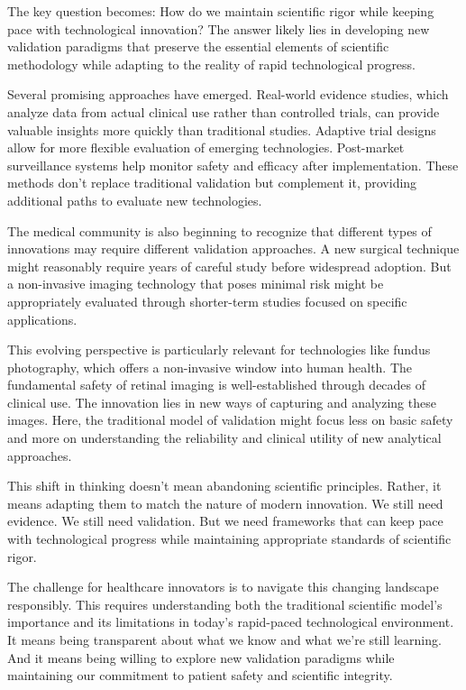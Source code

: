 \documentclass[
  Letterpaper,
]{scrbook}
\begin{document}
The key question becomes: How do we maintain scientific rigor while
keeping pace with technological innovation? The answer likely lies in
developing new validation paradigms that preserve the essential elements
of scientific methodology while adapting to the reality of rapid
technological progress.

Several promising approaches have emerged. Real-world evidence studies,
which analyze data from actual clinical use rather than controlled
trials, can provide valuable insights more quickly than traditional
studies. Adaptive trial designs allow for more flexible evaluation of
emerging technologies. Post-market surveillance systems help monitor
safety and efficacy after implementation. These methods don't replace
traditional validation but complement it, providing additional paths to
evaluate new technologies.

The medical community is also beginning to recognize that different
types of innovations may require different validation approaches. A new
surgical technique might reasonably require years of careful study
before widespread adoption. But a non-invasive imaging technology that
poses minimal risk might be appropriately evaluated through shorter-term
studies focused on specific applications.

This evolving perspective is particularly relevant for technologies like
fundus photography, which offers a non-invasive window into human
health. The fundamental safety of retinal imaging is well-established
through decades of clinical use. The innovation lies in new ways of
capturing and analyzing these images. Here, the traditional model of
validation might focus less on basic safety and more on understanding
the reliability and clinical utility of new analytical approaches.

This shift in thinking doesn't mean abandoning scientific principles.
Rather, it means adapting them to match the nature of modern innovation.
We still need evidence. We still need validation. But we need frameworks
that can keep pace with technological progress while maintaining
appropriate standards of scientific rigor.

The challenge for healthcare innovators is to navigate this changing
landscape responsibly. This requires understanding both the traditional
scientific model's importance and its limitations in today's rapid-paced
technological environment. It means being transparent about what we know
and what we're still learning. And it means being willing to explore new
validation paradigms while maintaining our commitment to patient safety
and scientific integrity.
\end{document}
